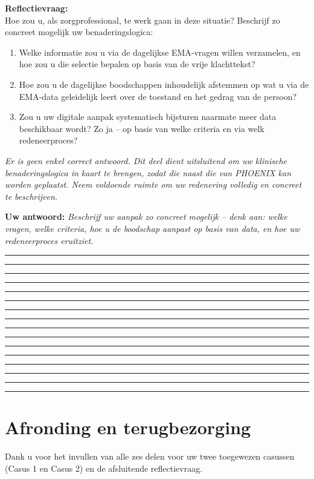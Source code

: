 \documentclass[11pt,a4paper]{article}
\newcommand{\writeline}{\vspace{0.22em}\noindent\rule{\linewidth}{0.25pt}\vspace{0.42em}\par}
\begin{document}
\begin{tcolorbox}[colback=AccentOrange,colframe=GoldAmber,arc=2.5mm,boxrule=0.9pt,
  left=10pt,right=10pt,top=9pt,bottom=9pt]
\medskip
\textbf{Reflectievraag:}\\[0.3em]
Hoe zou u, als zorgprofessional, te werk gaan in deze situatie?
Beschrijf zo concreet mogelijk uw benaderingslogica:
\begin{enumerate}[topsep=2pt,itemsep=1pt,label=\alph*.]
\item Welke informatie zou u via de dagelijkse EMA-vragen willen verzamelen, en hoe zou u
die selectie bepalen op basis van de vrije klachttekst?
\item Hoe zou u de dagelijkse boodschappen inhoudelijk afstemmen op wat u via de
EMA-data geleidelijk leert over de toestand en het gedrag van de persoon?
\item Zou u uw digitale aanpak systematisch bijsturen naarmate meer data beschikbaar wordt?
Zo ja -- op basis van welke criteria en via welk redeneerproces?
\end{enumerate}

\medskip\small
\textit{Er is geen enkel correct antwoord. Dit deel dient uitsluitend om uw klinische
benaderingslogica in kaart te brengen, zodat die naast die van PHOENIX kan worden
geplaatst. Neem voldoende ruimte om uw redenering volledig en concreet te beschrijven.}
\end{tcolorbox}

\vspace{0.5em}

\begin{responsebox}
\small\textbf{Uw antwoord:}
\textit{Beschrijf uw aanpak zo concreet mogelijk -- denk aan: welke vragen, welke criteria,
hoe u de boodschap aanpast op basis van data, en hoe uw redeneerproces eruitziet.}

\writeline\writeline\writeline\writeline\writeline\writeline\writeline\writeline\writeline\writeline\writeline\writeline\writeline\writeline\writeline\writeline
\end{responsebox}

\vspace{0.6em}
\newpage


\section{Afronding en terugbezorging}

Dank u voor het invullen van alle zes delen voor uw twee toegewezen casussen
(Casus 1 en Casus 2) en de afsluitende reflectievraag.
\end{document}
